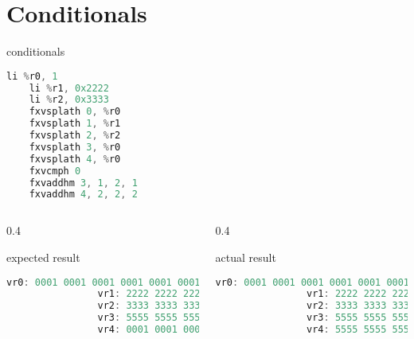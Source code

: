 \documentclass[10pt]{beamer}
\begin{document}
\section{Conditionals}

\begin{frame}[fragile]{conditionals}{}
	\begin{lstlisting}[language=C++,basicstyle=\ttfamily\scriptsize,keywordstyle=\color{red}]
	li %r0, 1
	li %r1, 0x2222
	li %r2, 0x3333
	fxvsplath 0, %r0
	fxvsplath 1, %r1
	fxvsplath 2, %r2
	fxvsplath 3, %r0
	fxvsplath 4, %r0
	fxvcmph 0
	fxvaddhm 3, 1, 2, 1	
	fxvaddhm 4, 2, 2, 2
	\end{lstlisting}
	\begin{columns}[t]
		\begin{column}{0.4\textwidth}
			\begin{block}{expected result}
      			\begin{lstlisting}[language=C++,basicstyle=\fontsize{5}{7}\selectfont\ttfamily,keywordstyle=\color{red}]
				vr0: 0001 0001 0001 0001 0001 0001 0001 0001
				vr1: 2222 2222 2222 2222 2222 2222 2222 2222
				vr2: 3333 3333 3333 3333 3333 3333 3333 3333
				vr3: 5555 5555 5555 5555 5555 5555 5555 5555
				vr4: 0001 0001 0001 0001 0001 0001 0001 0001
				\end{lstlisting}
			\end{block}
    	\end{column}
    	\begin{column}{0.4\textwidth}
    		\begin{block}{actual result}
      			\begin{lstlisting}[language=C++,basicstyle=\fontsize{5}{7}\selectfont\ttfamily,keywordstyle=\color{red}]
				vr0: 0001 0001 0001 0001 0001 0001 0001 0001
				vr1: 2222 2222 2222 2222 2222 2222 2222 2222
				vr2: 3333 3333 3333 3333 3333 3333 3333 3333
				vr3: 5555 5555 5555 5555 5555 5555 5555 5555
				vr4: 5555 5555 5555 5555 5555 5555 5555 5551
				\end{lstlisting}
			\end{block}
    	\end{column}
	\end{columns}
\end{frame}
\end{document}

